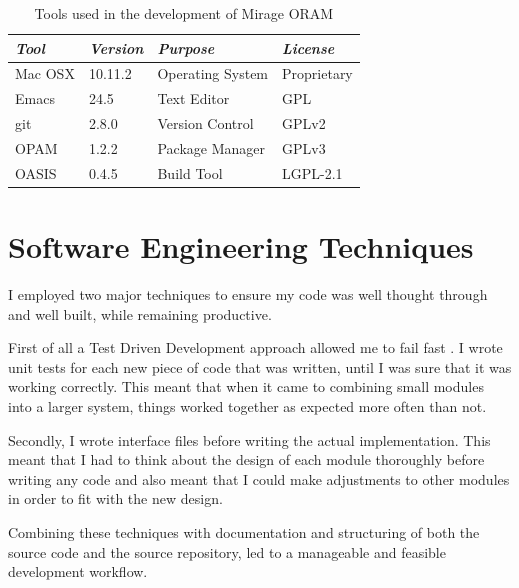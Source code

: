 \documentclass[12pt,a4paper,twoside,openright]{report}
\begin{document}
\begin{table}[t]
    \centering
    \begin{tabular}{|l|l|l|l|}
      \hline
      \textit{Tool} & \textit{Version} & \textit{Purpose} & \textit{License} \\
      \hline \hline
      Mac OSX & 10.11.2 & Operating System & Proprietary \\
      \hline
      Emacs & 24.5 & Text Editor & GPL \\
      \hline
      git & 2.8.0 & Version Control & GPLv2 \\ 
      \hline
      OPAM & 1.2.2 & Package Manager & GPLv3 \\
      \hline
      OASIS & 0.4.5 & Build Tool & LGPL-2.1 \\
      \hline
    \end{tabular}
    \caption{Tools used in the development of Mirage ORAM}
    \label{tab:devtools}
\end{table}

\section{Software Engineering Techniques}



I employed two major techniques to ensure my code was well thought through and well built, while remaining productive.

First of all a Test Driven Development approach allowed me to fail fast \cite{hunt2004pragmatic}. I wrote unit tests for each new piece of code that was written, until I was sure that it was working correctly. This meant that when it came to combining small modules into a larger system, things worked together as expected more often than not.

Secondly, I wrote interface files before writing the actual implementation. This meant that I had to think about the design of each module thoroughly before writing any code and also meant that I could make adjustments to other modules in order to fit with the new design.

Combining these techniques with documentation and structuring of both the source code and the source repository, led to a manageable and feasible development workflow.
\end{document}
